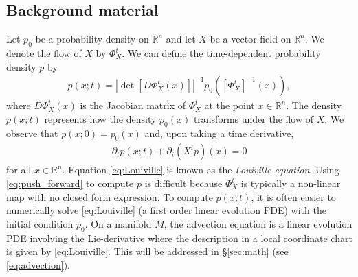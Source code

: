 \documentclass[letterpaper, 10 pt, conference]{ieeeconf}
\newcommand{\R}{\mathbb{R}}
\begin{document}
\subsection{Background material}
  Let $p_0$ be a probability density on $\R^n$
  and let $X$ be a vector-field on $\R^n$.
  We denote the flow of $X$
  by $\Phi_X^t$.
  We can define the time-dependent probability
  density $p$ by
  \begin{align}
    p( x ; t) = 
    \left| \det\left[ D\Phi_X^t(x) \right] \right|^{-1} p_0\left( \left[\Phi_X^t\right]^{-1}(x) \right), \label{eq:push_forward}
  \end{align}
  where $D\Phi_X^t(x)$ is the Jacobian matrix of
  $\Phi_X^t$ at the point $x \in \R^n$.
  The density $p(x;t)$ represents how the density
  $p_0(x)$ transforms under the flow of $X$.
  We observe that $p(x;0) = p_0(x)$ and, upon taking
  a time derivative,
  \begin{align}
    \partial_t p (x;t) + \partial_i (X^i p)(x) = 0 \label{eq:Louiville}
  \end{align}
  for all $x \in \R^n$.
  Equation \eqref{eq:Louiville} is known as the \emph{Louiville equation}.
  Using \eqref{eq:push_forward} to compute $p$ is difficult
  because $\Phi_X^t$ is typically a non-linear map with no closed
  form expression.
  To compute $p( x ; t)$, it is often easier
  to numerically solve \eqref{eq:Louiville}
  (a first order linear evolution PDE)
  with the initial condition $p_0$.
  On a manifold $M$, the advection equation is a linear
  evolution PDE involving the Lie-derivative
  where the description in a local coordinate chart is
  given by \eqref{eq:Louiville}.
  This will be addressed in \S \ref{sec:math} (see \eqref{eq:advection}).
\end{document}
